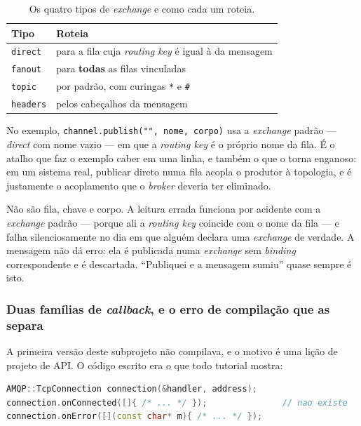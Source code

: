 \begin{table}[htbp]
\centering
\caption{Os quatro tipos de \emph{exchange} e como cada um roteia.}
\label{tab:exchanges}
\footnotesize
\begin{tabular}{@{}ll@{}}
\toprule
\textbf{Tipo} & \textbf{Roteia} \\
\midrule
\texttt{direct}  & para a fila cuja \emph{routing key} é igual à da mensagem \\
\texttt{fanout}  & para \textbf{todas} as filas vinculadas \\
\texttt{topic}   & por padrão, com curingas \texttt{*} e \texttt{\#} \\
\texttt{headers} & pelos cabeçalhos da mensagem \\
\bottomrule
\end{tabular}
\end{table}

No exemplo, \texttt{channel.publish("", nome, corpo)} usa a \emph{exchange}
padrão --- \emph{direct} com nome vazio --- em que a \emph{routing key} é o
próprio nome da fila. É o atalho que faz o exemplo caber em uma linha, e também
o que o torna enganoso: em um sistema real, publicar direto numa fila acopla o
produtor à topologia, e é justamente o acoplamento que o \emph{broker} deveria
ter eliminado.

\begin{armadilha}
Não são fila, chave e corpo. A leitura errada funciona por acidente com a
\emph{exchange} padrão --- porque ali a \emph{routing key} coincide com o nome
da fila --- e falha silenciosamente no dia em que alguém declara uma
\emph{exchange} de verdade. A mensagem não dá erro: ela é publicada numa
\emph{exchange} sem \emph{binding} correspondente e é descartada. ``Publiquei e
a mensagem sumiu'' quase sempre é isto.
\end{armadilha}

\subsubsection{Duas famílias de \emph{callback}, e o erro de compilação que as separa}

A primeira versão deste subprojeto não compilava, e o motivo é uma lição de
projeto de API. O código escrito era o que todo tutorial mostra:

\begin{lstlisting}[style=bt, language=C++,
    caption={A versão que não compila.}]
AMQP::TcpConnection connection(&handler, address);
connection.onConnected([]{ /* ... */ });               // nao existe
connection.onError([](const char* m){ /* ... */ });
\end{lstlisting}

